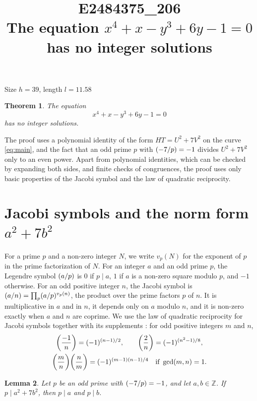 \documentclass[11pt]{article}
\title{\textbf{E2484375\_206}\\[4pt] {\Large The equation $x^{4}+x-y^{3}+6y-1=0$ has no integer solutions}}
\author{}
\date{}
\newtheorem{theorem}{Theorem}
\newtheorem{lemma}[theorem]{Lemma}
\newcommand{\Z}{\mathbb{Z}}
\newcommand{\leg}[2]{\mathchoice{\biggl(\dfrac{#1}{#2}\biggr)}{(#1/#2)}{(#1/#2)}{(#1/#2)}}
\begin{document}
\maketitle
\vspace{-8ex}
\begin{center}
Size $h=39$, length $l=11.58$
\end{center}

\begin{theorem}\label{thm:main}
The equation
\begin{equation}\label{eq:main}
x^{4}+x-y^{3}+6y-1=0
\end{equation}
has no integer solutions.
\end{theorem}

The proof uses a polynomial identity of the form $HT=U^2+7V^2$ on the curve \eqref{eq:main}, and the fact that an odd prime $p$ with $\leg{-7}{p}=-1$ divides $U^2+7V^2$ only to an even power. Apart from polynomial identities, which can be checked by expanding both sides, and finite checks of congruences, the proof uses only basic properties of the Jacobi symbol and the law of quadratic reciprocity.

\section{\texorpdfstring{Jacobi symbols and the norm form $a^2+7b^2$}{Jacobi symbols and the norm form}}

For a prime $p$ and a non-zero integer $N$, we write $v_p(N)$ for the exponent of $p$ in the prime factorization of $N$. For an integer $a$ and an odd prime $p$, the Legendre symbol $\leg{a}{p}$ is $0$ if $p\mid a$, $1$ if $a$ is a non-zero square modulo $p$, and $-1$ otherwise. For an odd positive integer $n$, the Jacobi symbol is $\leg{a}{n}=\prod_p\leg{a}{p}^{v_p(n)}$, the product over the prime factors $p$ of $n$. It is multiplicative in $a$ and in $n$, it depends only on $a$ modulo $n$, and it is non-zero exactly when $a$ and $n$ are coprime. We use the law of quadratic reciprocity for Jacobi symbols together with its supplements \cite[Chapter~5, \S2]{IR}: for odd positive integers $m$ and $n$,
\begin{gather*}
\leg{-1}{n}=(-1)^{(n-1)/2},\qquad\leg{2}{n}=(-1)^{(n^2-1)/8},\\
\leg{m}{n}\leg{n}{m}=(-1)^{(m-1)(n-1)/4}\quad\text{if }\gcd(m,n)=1.
\end{gather*}

\begin{lemma}\label{lem:divides}
Let $p$ be an odd prime with $\leg{-7}{p}=-1$, and let $a,b\in\Z$. If $p\mid a^2+7b^2$, then $p\mid a$ and $p\mid b$.
\end{lemma}
\end{document}
